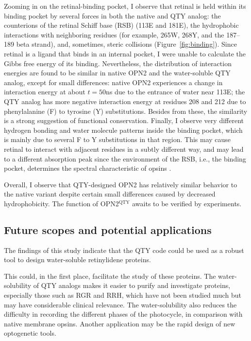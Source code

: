 \documentclass[fleqn, 10pt]{manuscript}
\begin{document}
Zooming in on the retinal-binding pocket, I observe that retinal is held within its binding pocket by several forces in both the native and QTY analog: the counterions of the retinal Schiff base (RSB) (113E and 181E), the hydrophobic interactions with neighboring residues (for example, 265W, 268Y, and the 187--189 beta strand), and, sometimes, steric collisions (Figure~\ref{fig:binding}). Since retinal is a ligand that binds in an internal pocket, I were unable to calculate the Gibbs free energy of its binding. Nevertheless, the distribution of interaction energies are found to be similar in native OPN2 and the water-soluble QTY analog, except for small differences: native OPN2 experiences a change in interaction energy at about $t=50$ns due to the entrance of water near 113E; the QTY analog has more negative interaction energy at residues 208 and 212 due to phenylalanine (F) to tyrosine (Y) substitutions. Besides from these, the similarity is a strong suggestion of functional conservation. Finally, I observe very different hydrogen bonding and water molecule patterns inside the binding pocket, which is mainly due to several F to Y substitutions in that region. This may cause retinal to interact with adjacent residues in a subtly different way, and may lead to a different absorption peak since the environment of the RSB, i.e., the binding pocket, determines the spectral characteristic of opsins \citep{Fenno_2011}. 

Overall, I observe that QTY-designed OPN2 has relatively similar behavior to the native variant despite certain small differences caused by decreased hydrophobicity. The function of OPN2$^{\textrm{QTY}}$ awaits to be verified by experiments. 

\subsection*{Future scopes and potential applications}

The findings of this study indicate that the QTY code could be used as a robust tool to design water-soluble retinylidene proteins. 

This could, in the first place, facilitate the study of these proteins. The water-solubility of QTY analogs makes it easier to purify and investigate proteins, especially those such as RGR and RRH, which have not been studied much but may have considerable clinical relevance. The water-solubility also reduces the difficulty in recording the different phases of the photocycle, in comparison with native membrane opsins. Another application may be the rapid design of new optogenetic tools. 
\end{document}
